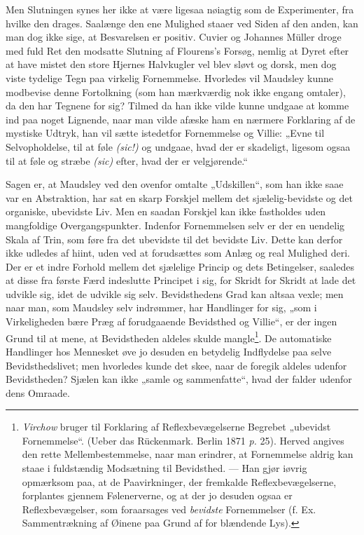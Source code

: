 \documentclass[12pt,a4paper,openany]{book}
\newcommand{\opage}[1]{\marginnote{\footnotesize\textit{[#1]}}}
\begin{document}
Men Slutningen synes her ikke at være ligesaa nøiagtig
som de Experimenter, fra hvilke den drages. Saalænge
den ene Mulighed staaer ved Siden af den anden, kan man
dog ikke sige, at Besvarelsen er positiv. Cuvier og Johannes
Müller droge med fuld Ret den modsatte Slutning
af Flourens's Forsøg, nemlig at Dyret efter at have mistet
den store Hjernes Halvkugler vel blev sløvt og dorsk, men
dog viste tydelige Tegn paa virkelig Fornemmelse. Hvorledes
vil Maudsley kunne modbevise denne Fortolkning (som
han mærkværdig nok ikke engang omtaler), da den har Tegnene
for sig? Tilmed da han ikke vilde kunne undgaae at
\opage{316}komme ind paa noget Lignende, naar man vilde afæske ham
en nærmere Forklaring af de mystiske Udtryk, han vil sætte
istedetfor Fornemmelse og Villie: „Evne til Selvopholdelse,
til at føle \textit{(sic!)} og undgaae, hvad der er skadeligt, ligesom
ogsaa til at føle og stræbe \textit{(sic)} efter, hvad der er velgjørende.“

Sagen er, at Maudsley ved den ovenfor omtalte „Udskillen“,
som han ikke saae var en Abstraktion, har sat en
skarp Forskjel mellem det sjælelig-bevidste og det organiske,
ubevidste Liv. Men en saadan Forskjel kan ikke fastholdes
uden mangfoldige Overgangspunkter. Indenfor Fornemmelsen
selv er der en uendelig Skala af Trin, som føre fra det
ubevidste til det bevidste Liv. Dette kan derfor ikke udledes af
hiint, uden ved at forudsættes som Anlæg og real Mulighed
deri. Der er et indre Forhold mellem det sjælelige Princip
og dets Betingelser, saaledes at disse fra første Færd indeslutte
Principet i sig, for Skridt for Skridt at lade det
udvikle sig, idet de udvikle sig selv. Bevidsthedens Grad
kan altsaa vexle; men naar man, som Maudsley selv indrømmer,
har Handlinger for sig, „som i Virkeligheden
bære Præg af forudgaaende Bevidsthed og Villie“, er der
ingen Grund til at mene, at Bevidstheden aldeles skulde
mangle\footnote{\emph{Virchow} bruger til Forklaring af Reflexbevægelserne Begrebet „ubevidst Fornemmelse“. (Ueber das Rückenmark. Berlin 1871 \textit{p.} 25). Herved angives den rette Mellembestemmelse, naar man erindrer, at Fornemmelse aldrig kan staae i fuldstændig Modsætning til Bevidsthed. --- Han gjør iøvrig opmærksom paa, at de Paavirkninger, der fremkalde Reflexbevægelserne, forplantes gjennem Følenerverne, og at der jo desuden ogsaa er Reflexbevægelser, som foraarsages ved \emph{bevidste} Fornemmelser (f. Ex. Sammentrækning af Øinene paa Grund af for blændende Lys).}. De automatiske Handlinger hos Mennesket øve jo
desuden en betydelig Indflydelse paa selve Bevidsthedslivet;
men hvorledes kunde det skee, naar de foregik aldeles udenfor
Bevidstheden? Sjælen kan ikke „samle og sammenfatte“,
hvad der falder udenfor dens Omraade.
\end{document}
